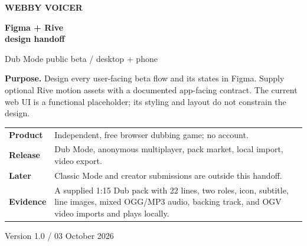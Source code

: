 \documentclass[10pt,a4paper]{article}
\begin{document}
\begin{titlepage}
\vspace*{24mm}
{\Large\bfseries\color{teal} WEBBY VOICER\par}
\vspace{8mm}
{\fontsize{34}{38}\selectfont\bfseries\color{ink} Figma + Rive\\design handoff\par}
\vspace{7mm}
{\Large\color{muted} Dub Mode public beta / desktop + phone\par}
\vspace{17mm}
\vspace{12mm}
\begin{callout}
\textbf{Purpose.} Design every user-facing beta flow and its states in Figma. Supply optional Rive motion assets with a documented app-facing contract. The current web UI is a functional placeholder; its styling and layout do not constrain the design.
\end{callout}
\vspace{7mm}
\begin{tabularx}{\linewidth}{@{}>{\bfseries}p{34mm}X@{}}
Product & Independent, free browser dubbing game; no account.\\
Release & Dub Mode, anonymous multiplayer, pack market, local import, video export.\\
Later & Classic Mode and creator submissions are outside this handoff.\\
Evidence & A supplied 1:15 Dub pack with 22 lines, two roles, icon, subtitle, line images, mixed OGG/MP3 audio, backing track, and OGV video imports and plays locally.\\
\end{tabularx}
\vfill
{\small\color{muted}Version 1.0 / 03 October 2026\par}
\end{titlepage}

\setcounter{page}{2}
\tableofcontents
\clearpage
{}
\end{document}
